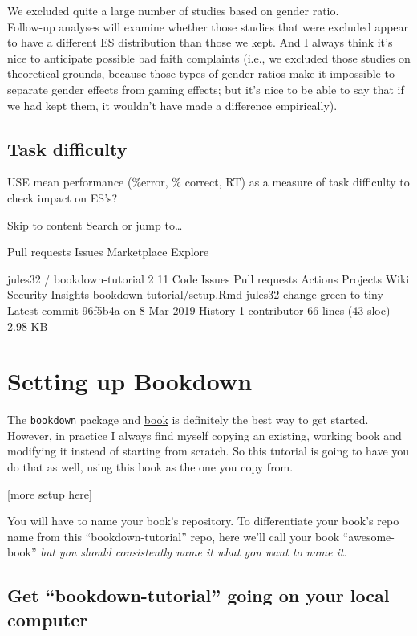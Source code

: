 \documentclass[
]{book}
\begin{document}
We excluded quite a large number of studies based on gender ratio.\\
Follow-up analyses will examine whether those studies that were excluded appear to have
a different ES distribution than those we kept. And I always think it's nice to anticipate
possible bad faith complaints (i.e., we excluded those studies on theoretical grounds,
because those types of gender ratios make it impossible to separate gender effects from gaming effects;
but it's nice to be able to say that if we had kept them, it wouldn't have made a difference empirically).

\hypertarget{task-difficulty}{%
\section{Task difficulty}\label{task-difficulty}}

USE mean performance (\%error, \% correct, RT) as a measure of task difficulty to check impact on ES's?

Skip to content
Search or jump to\ldots{}

Pull requests
Issues
Marketplace
Explore

\citet{bbediou}
jules32
/
bookdown-tutorial
2
11
Code
Issues
Pull requests
Actions
Projects
Wiki
Security
Insights
bookdown-tutorial/setup.Rmd
\citet{jules32}
jules32 change green to tiny
Latest commit 96f5b4a on 8 Mar 2019
History
1 contributor
66 lines (43 sloc) 2.98 KB

\hypertarget{setup}{%
\chapter{Setting up Bookdown}\label{setup}}

The \texttt{bookdown} package and \href{https://bookdown.org/yihui/bookdown/get-started.html}{book} is definitely the best way to get started. However, in practice I always find myself copying an existing, working book and modifying it instead of starting from scratch. So this tutorial is going to have you do that as well, using this book as the one you copy from.

{[}more setup here{]}

You will have to name your book's repository. To differentiate your book's repo name from this ``bookdown-tutorial'' repo, here we'll call your book ``awesome-book'' \emph{but you should consistently name it what you want to name it}.

\hypertarget{get-bookdown-tutorial-going-on-your-local-computer}{%
\section{Get ``bookdown-tutorial'' going on your local computer}\label{get-bookdown-tutorial-going-on-your-local-computer}}
\end{document}
